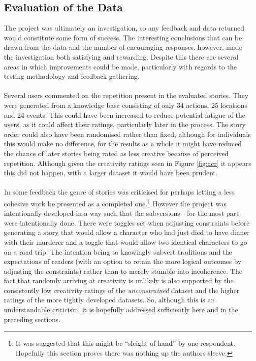 \documentclass[letterpaper]{article}
\begin{document}
\subsection{Evaluation of the Data}
The project was ultimately an investigation, so any feedback and data returned would constitute some form of success. The interesting conclusions that can be drawn from the data and the number of encouraging responses, however, made the investigation both satisfying and rewarding. Despite this there are several areas in which improvements could be made, particularly with regards to the testing methodology and feedback gathering.\\
\\Several users commented on the repetition present in the evaluated stories. They were generated from a knowledge base consisting of only 34 actions, 25 locations and 24 events. This could have been increased to reduce potential fatigue of the users, as it could affect their ratings, particularly later in the process. The story order could also have been randomised rather than fixed, although for individuals this would make no difference, for the results as a whole it might have reduced the chance of later stories being rated as less creative because of perceived repetition. Although given the creativity ratings seen in Figure \ref{fig:acr} it appears this did not happen, with a larger dataset it would have been prudent.\\
\\In some feedback the genre of stories was criticised for perhaps letting a less cohesive work be presented as a completed one.\footnote{It was suggested that this might be \enquote{sleight of hand} by one respondent. Hopefully this section proves there was nothing up the authors sleeve.} However the project was intentionally developed in a way such that the subversions - for the most part - were intentionally done. There were toggles set when adjusting constraints before generating a story that would allow a character who had just died to have dinner with their murderer and a toggle that would allow two identical characters to go on a road trip. The intention being to knowingly subvert traditions and the expectations of readers (with an option to retain the more logical outcomes by adjusting the constraints) rather than to merely stumble into incoherence. The fact that randomly arriving at creativity is unlikely is also supported by the consistently low creativity ratings of the \emph{unconstrained} dataset and the higher ratings of the more tightly developed datasets. So, although this is an understandable criticism, it is hopefully addressed sufficiently here and in the preceding sections.\\
\end{document}
